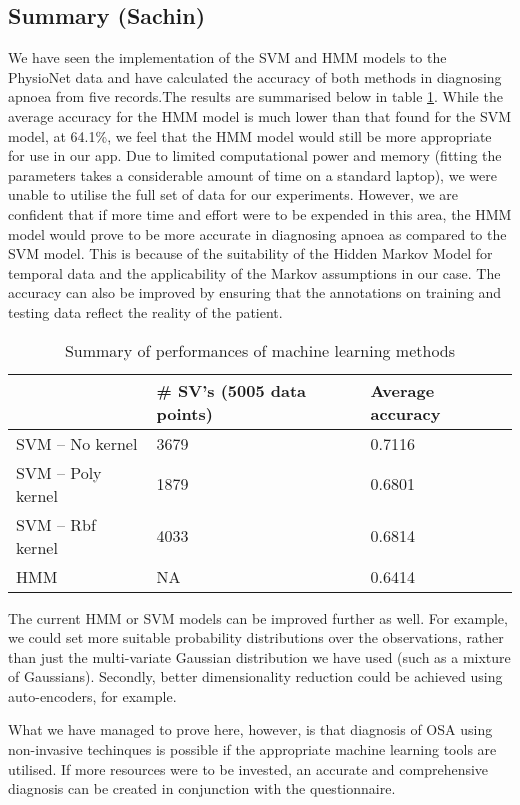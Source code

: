 \subsection{Summary (Sachin)}
\label{sec:mlExperimentsSummary}

We have seen the implementation of the SVM and HMM models to the PhysioNet data and have calculated the accuracy of both methods in diagnosing apnoea from five records.The results are summarised below in table \ref{table:mlResults}. While the average accuracy for the HMM model is much lower than that found for the SVM model, at 64.1\%, we feel that the HMM model would still be more appropriate for use in our app. Due to limited computational power and memory (fitting the parameters takes a considerable amount of time on a standard laptop), we were unable to utilise the full set of data for our experiments. However, we are confident that if more time and effort were to be expended in this area, the HMM model would prove to be more accurate in diagnosing apnoea as compared to the SVM model. This is because of the suitability of the Hidden Markov Model for temporal data and the applicability of the Markov assumptions in our case. The accuracy can also be improved by ensuring that the annotations on training and testing data reflect the reality of the patient.

\begin{table}[h]
		\centering
		\begin{tabular}{@{}lll@{}}
		\toprule
		            & \# SV's (5005 data points) & Average accuracy \\ \midrule
		SVM -- No kernel   & 3679                       & 0.7116           \\
		SVM -- Poly kernel & 1879                       & 0.6801           \\
		SVM -- Rbf kernel  & 4033                       & 0.6814           \\
		HMM & NA & 0.6414 \\ \bottomrule

		\end{tabular}
		\caption{Summary of performances of machine learning methods}
		\label{table:mlResults}
	\end{table}

The current HMM or SVM models can be improved further as well. For example, we could set more suitable probability distributions over the observations, rather than just the multi-variate Gaussian distribution we have used (such as a mixture of Gaussians). Secondly, better dimensionality reduction could be achieved using auto-encoders, for example.

What we have managed to prove here, however, is that diagnosis of OSA using non-invasive techinques is possible if the appropriate machine learning tools are utilised. If more resources were to be invested, an accurate and comprehensive diagnosis can be created in conjunction with the questionnaire.